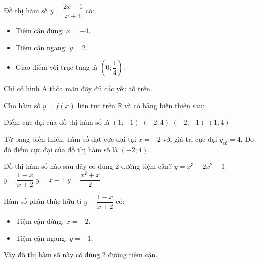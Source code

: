 \begin{ex}
{}
{}
\begin{loigiai}
Đồ thị hàm số $y = \dfrac{2x+1}{x+4}$ có:
\begin{itemize}
    \item Tiệm cận đứng: $x = -4$.
    \item Tiệm cận ngang: $y = 2$.
    \item Giao điểm với trục tung là $\left(0; \dfrac{1}{4}\right)$.
\end{itemize}
Chỉ có hình A thỏa mãn đầy đủ các yếu tố trên.
\end{loigiai}
\end{ex}

\begin{ex}
Cho hàm số $y = f(x)$ liên tục trên $\mathbb{R}$ và có bảng biến thiên sau:
\begin{center}
\end{center}
Điểm cực đại của đồ thị hàm số là
\choice
{$(1; -1)$}
{\True $(-2; 4)$}
{$(-2; -1)$}
{$(1; 4)$}
\begin{loigiai}
Từ bảng biến thiên, hàm số đạt cực đại tại $x = -2$ với giá trị cực đại $y_{\text{cđ}} = 4$. Do đó điểm cực đại của đồ thị hàm số là $(-2; 4)$.
\end{loigiai}
\end{ex}

\begin{ex}
Đồ thị hàm số nào sau đây có đúng $2$ đường tiệm cận?
\choice
{$y = x^3 - 2x^2 - 1$}
{\True $y = \dfrac{1-x}{x+2}$}
{$y = x+1$}
{$y = \dfrac{x^2+x}{2}$}
\begin{loigiai}
Hàm số phân thức hữu tỉ $y = \dfrac{1-x}{x+2}$ có:
\begin{itemize}
    \item Tiệm cận đứng: $x = -2$.
    \item Tiệm cận ngang: $y = -1$.
\end{itemize}
Vậy đồ thị hàm số này có đúng 2 đường tiệm cận.
\end{loigiai}
\end{ex}


